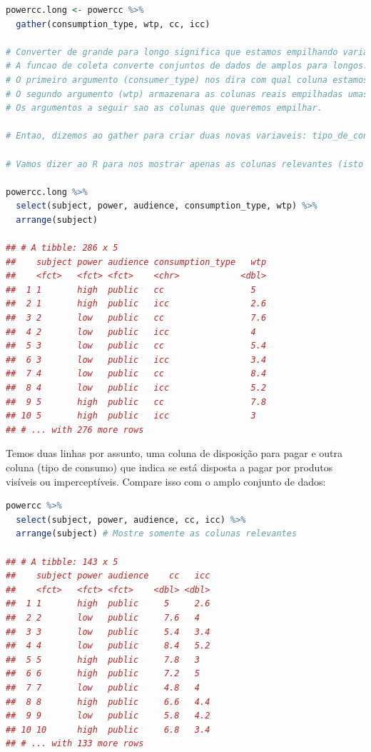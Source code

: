 \documentclass{article}
\begin{document}
\begin{lstlisting}[language=R]
powercc.long <- powercc %>% 
  gather(consumption_type, wtp, cc, icc)

# Converter de grande para longo significa que estamos empilhando varias colunas umas sobre as outras. Para isso, precisamos de uma variavel extra para acompanhar qual coluna estamos lidando.
# A funcao de coleta converte conjuntos de dados de amplos para longos.
# O primeiro argumento (consumer_type) nos dira com qual coluna estamos lidando. Essa eh a variavel que armazenara os nomes das colunas que estamos empilhando.
# O segundo argumento (wtp) armazenara as colunas reais empilhadas umas sobre as outras.
# Os argumentos a seguir sao as colunas que queremos empilhar.

# Entao, dizemos ao gather para criar duas novas variaveis: tipo_de_consumo e vontade de pagar, para representar o empilhamento de um determinado numero de colunas.

# Vamos dizer ao R para nos mostrar apenas as colunas relevantes (isto eh apenas para fins de apresentacao):

powercc.long %>%
  select(subject, power, audience, consumption_type, wtp) %>% 
  arrange(subject)
  
## # A tibble: 286 x 5
##    subject power audience consumption_type   wtp
##    <fct>   <fct> <fct>    <chr>            <dbl>
##  1 1       high  public   cc                 5  
##  2 1       high  public   icc                2.6
##  3 2       low   public   cc                 7.6
##  4 2       low   public   icc                4  
##  5 3       low   public   cc                 5.4
##  6 3       low   public   icc                3.4
##  7 4       low   public   cc                 8.4
##  8 4       low   public   icc                5.2
##  9 5       high  public   cc                 7.8
## 10 5       high  public   icc                3  
## # ... with 276 more rows

\end{lstlisting}

Temos duas linhas por assunto, uma coluna de disposição para pagar e outra coluna (tipo de consumo) que indica se está disposta a pagar por produtos visíveis ou imperceptíveis. Compare isso com o amplo conjunto de dados:

\begin{lstlisting}[language=R]
powercc %>% 
  select(subject, power, audience, cc, icc) %>% 
  arrange(subject) # Mostre somente as colunas relevantes
  
## # A tibble: 143 x 5
##    subject power audience    cc   icc
##    <fct>   <fct> <fct>    <dbl> <dbl>
##  1 1       high  public     5     2.6
##  2 2       low   public     7.6   4  
##  3 3       low   public     5.4   3.4
##  4 4       low   public     8.4   5.2
##  5 5       high  public     7.8   3  
##  6 6       high  public     7.2   5  
##  7 7       low   public     4.8   4  
##  8 8       high  public     6.6   4.4
##  9 9       low   public     5.8   4.2
## 10 10      high  public     6.8   3.4
## # ... with 133 more rows

\end{lstlisting}
\end{document}
